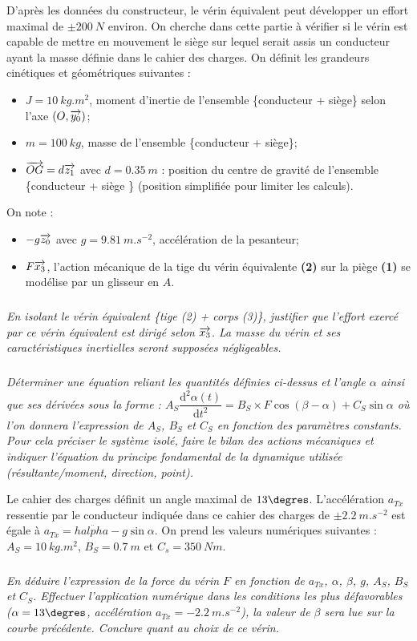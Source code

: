 \documentclass[10pt,fleqn]{article} %
\begin{document}
\begin{multicols}{2}
D'après les données du constructeur, le vérin équivalent peut développer un effort maximal de $\pm \SI{200}{N}$ environ.  On cherche dans cette partie à vérifier si le vérin est capable de mettre en mouvement le siège sur lequel serait assis un conducteur ayant la masse définie dans le cahier des charges. 
On définit les grandeurs cinétiques et géométriques suivantes :
\begin{itemize}
\item $J=\SI{10}{kg.m^2}$, moment d'inertie de l'ensemble \{conducteur + siège\} selon l'axe $\left( O,\overrightarrow{y_0}\right)$;
\item $m=\SI{100}{kg}$, masse de l'ensemble \{conducteur + siège\};
\item $\overrightarrow{OG}=d\overrightarrow{z_1}$ avec $d=\SI{0,35}{m}$ : position du centre de gravité de l'ensemble \{conducteur + siège \} (position simplifiée pour limiter les calculs).  
\end{itemize}
On note : 
\begin{itemize}
\item $-g\overrightarrow{z_0}$ avec $g=\SI{9,81}{m.s^{-2}}$, accélération de la pesanteur;
\item $F\overrightarrow{x_3}$, l'action mécanique de la tige du vérin équivalente \textbf{(2)} sur la piège 
\textbf{(1)} se modélise par un glisseur en $A$.
\end{itemize}

\subparagraph{}\textit{En isolant le vérin équivalent \{tige (2) + corps (3)\}, justifier que
l’effort exercé par ce vérin équivalent est dirigé selon $\overrightarrow{x_3}$.  La masse du vérin et ses caractéristiques inertielles seront supposées négligeables.}

\subparagraph{}\textit{Déterminer une équation reliant les quantités définies ci-dessus et l’angle $\alpha$ ainsi que ses dérivées sous la forme : $A_S\dfrac{\text{d}^2\alpha(t)}{\text{d}t^2}=B_S \times F\cos \left( \beta-\alpha\right)+C_S \sin \alpha$ où l'on donnera l'expression de $A_S$, $B_S$ et $C_S$ en fonction des paramètres constants. Pour cela préciser le système isolé, faire le bilan des actions mécaniques et indiquer l’équation du principe fondamental de la dynamique utilisée (résultante/moment, direction, point).}

Le cahier des charges définit un angle maximal de $13\degres$. L'accélération $a_{Tx}$ ressentie par le conducteur indiquée dans ce cahier des charges de $\pm\SI{2,2}{m.s^{-2}}$ est égale à $a_{Tx}=h\ddot{alpha}-g\sin\alpha$. On prend les valeurs numériques suivantes : $A_S = \SI{10}{kg.m^2}$, $B_S=\SI{0,7}{m}$ et $C_s=\SI{350}{Nm}$.

\subparagraph{}\textit{En déduire l'expression de la force du vérin $F$ en fonction de $a_{Tx}$, $\alpha$, $\beta$, $g$, $A_S$, $B_S$ et $C_S$. Effectuer l'application numérique dans les conditions les plus défavorables ($\alpha=13\degres$, accélération $a_{Tx}=\SI{-2,2}{m.s^{-2}}$), la valeur de $\beta$ sera lue sur la courbe précédente. Conclure quant au choix de ce vérin.}

\ifprof
\else
\end{multicols}
\fi
\end{document}
